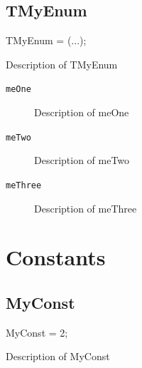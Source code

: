 \documentclass{report}
\begin{document}
\subsection*{TMyEnum}
\begin{list}{}{
\setlength{\itemindent}{0cm}
\setlength{\listparindent}{0cm}
\setlength{\leftmargin}{\evensidemargin}
\addtolength{\leftmargin}{\tmplength}
\settowidth{\labelsep}{X}
\addtolength{\leftmargin}{\labelsep}
\setlength{\labelwidth}{\tmplength}
}
\begin{flushleft}
\item[\textbf{Declaration}\hfill]
\begin{ttfamily}
TMyEnum = (...);\end{ttfamily}


\end{flushleft}
\par
\item[\textbf{Description}]
Description of TMyEnum\item[\textbf{Values}]
\begin{description}
\item[\texttt{meOne}] Description of meOne
\item[\texttt{meTwo}] Description of meTwo
\item[\texttt{meThree}] Description of meThree
\end{description}


\end{list}
\section{Constants}
\subsection*{MyConst}
\begin{list}{}{
\setlength{\itemindent}{0cm}
\setlength{\listparindent}{0cm}
\setlength{\leftmargin}{\evensidemargin}
\addtolength{\leftmargin}{\tmplength}
\settowidth{\labelsep}{X}
\addtolength{\leftmargin}{\labelsep}
\setlength{\labelwidth}{\tmplength}
}
\begin{flushleft}
\item[\textbf{Declaration}\hfill]
\begin{ttfamily}
MyConst = 2;\end{ttfamily}


\end{flushleft}
\par
\item[\textbf{Description}]
Description of MyConst

\end{list}
\end{document}
